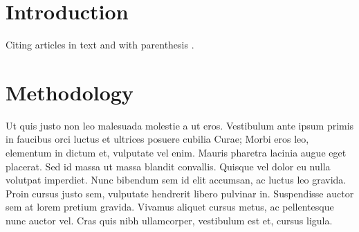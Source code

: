 \documentclass[twocolumn]{article}
\title{\Title}
\author{
    Leonardo Uieda \\ \texttt{my@email.com}
    \and
    Val\'eria C. F. Barbosa \\ \texttt{her@email.com}
}
\begin{document}
\maketitle

\begin{abstract}
Lorem ipsum dolor sit amet, consectetur adipiscing elit. Nam eu dolor pretium,
egestas mauris sed, dapibus quam. Duis hendrerit mollis nunc a consequat. Nulla
et sem consectetur, interdum velit eget, aliquam ipsum. Praesent sagittis
tortor diam, sed ultrices magna ullamcorper vitae. Proin vitae orci augue.
Morbi dictum ligula gravida sem malesuada facilisis. Mauris nibh metus, cursus
eget imperdiet vitae, pretium at lorem. Praesent nisi mauris, pretium ut risus
fermentum, egestas tincidunt nibh. Mauris nulla orci, consequat eu pharetra
non, mattis ut urna. Mauris facilisis orci eros. Nam mattis non magna iaculis
consectetur. Morbi sodales dolor vitae felis sagittis, eget faucibus turpis
convallis. Nullam malesuada, mauris et ultricies rutrum, odio nulla gravida
nunc, ac volutpat eros lectus eget lacus. Integer venenatis velit vel justo
pellentesque, quis molestie sem vestibulum.
\end{abstract}

\section{Introduction}

Citing articles in text \citet{Asgharzadeh2007} and with parenthesis
\citep{Braitenberg2011}.


\section{Methodology}

Ut quis justo non leo malesuada molestie a ut eros. Vestibulum ante ipsum
primis in faucibus orci luctus et ultrices posuere cubilia Curae; Morbi eros
leo, elementum in dictum et, vulputate vel enim. Mauris pharetra lacinia augue
eget placerat. Sed id massa ut massa blandit convallis. Quisque vel dolor eu
nulla volutpat imperdiet. Nunc bibendum sem id elit accumsan, ac luctus leo
gravida. Proin cursus justo sem, vulputate hendrerit libero pulvinar in.
Suspendisse auctor sem at lorem pretium gravida. Vivamus aliquet cursus metus,
ac pellentesque nunc auctor vel. Cras quis nibh ullamcorper, vestibulum est et,
cursus ligula.
\end{document}

